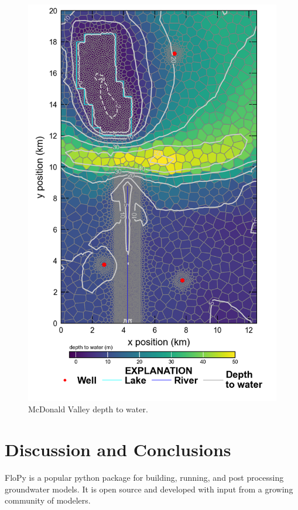 \documentclass[11pt, oneside]{article}   	%
\begin{document}
\begin{figure}[h]
	\begin{center}
		\includegraphics{figures/mv_voronoi_dtw.png}
	\end{center}
	\caption{McDonald Valley depth to water.}
	\label{fig:mvdtw}
\end{figure}


\section{Discussion and Conclusions}
FloPy is a popular python package for building, running, and post processing groundwater models.  It is open source and developed with input from a growing community of modelers.  
\end{document}
